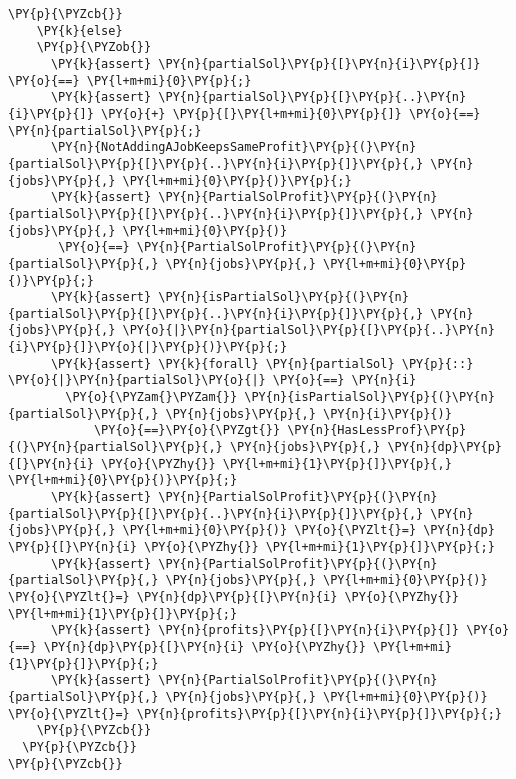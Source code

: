 \begin{itemize}
\begin{Verbatim}[commandchars=\\\{\},fontsize=\footnotesize]
    \PY{p}{\PYZcb{}}
    \PY{k}{else}
    \PY{p}{\PYZob{}}
      \PY{k}{assert} \PY{n}{partialSol}\PY{p}{[}\PY{n}{i}\PY{p}{]} \PY{o}{==} \PY{l+m+mi}{0}\PY{p}{;}
      \PY{k}{assert} \PY{n}{partialSol}\PY{p}{[}\PY{p}{..}\PY{n}{i}\PY{p}{]} \PY{o}{+} \PY{p}{[}\PY{l+m+mi}{0}\PY{p}{]} \PY{o}{==} \PY{n}{partialSol}\PY{p}{;}
      \PY{n}{NotAddingAJobKeepsSameProfit}\PY{p}{(}\PY{n}{partialSol}\PY{p}{[}\PY{p}{..}\PY{n}{i}\PY{p}{]}\PY{p}{,} \PY{n}{jobs}\PY{p}{,} \PY{l+m+mi}{0}\PY{p}{)}\PY{p}{;}
      \PY{k}{assert} \PY{n}{PartialSolProfit}\PY{p}{(}\PY{n}{partialSol}\PY{p}{[}\PY{p}{..}\PY{n}{i}\PY{p}{]}\PY{p}{,} \PY{n}{jobs}\PY{p}{,} \PY{l+m+mi}{0}\PY{p}{)}
       \PY{o}{==} \PY{n}{PartialSolProfit}\PY{p}{(}\PY{n}{partialSol}\PY{p}{,} \PY{n}{jobs}\PY{p}{,} \PY{l+m+mi}{0}\PY{p}{)}\PY{p}{;}
      \PY{k}{assert} \PY{n}{isPartialSol}\PY{p}{(}\PY{n}{partialSol}\PY{p}{[}\PY{p}{..}\PY{n}{i}\PY{p}{]}\PY{p}{,} \PY{n}{jobs}\PY{p}{,} \PY{o}{|}\PY{n}{partialSol}\PY{p}{[}\PY{p}{..}\PY{n}{i}\PY{p}{]}\PY{o}{|}\PY{p}{)}\PY{p}{;}
      \PY{k}{assert} \PY{k}{forall} \PY{n}{partialSol} \PY{p}{::} \PY{o}{|}\PY{n}{partialSol}\PY{o}{|} \PY{o}{==} \PY{n}{i}  
        \PY{o}{\PYZam{}\PYZam{}} \PY{n}{isPartialSol}\PY{p}{(}\PY{n}{partialSol}\PY{p}{,} \PY{n}{jobs}\PY{p}{,} \PY{n}{i}\PY{p}{)}
            \PY{o}{==}\PY{o}{\PYZgt{}} \PY{n}{HasLessProf}\PY{p}{(}\PY{n}{partialSol}\PY{p}{,} \PY{n}{jobs}\PY{p}{,} \PY{n}{dp}\PY{p}{[}\PY{n}{i} \PY{o}{\PYZhy{}} \PY{l+m+mi}{1}\PY{p}{]}\PY{p}{,} \PY{l+m+mi}{0}\PY{p}{)}\PY{p}{;}
      \PY{k}{assert} \PY{n}{PartialSolProfit}\PY{p}{(}\PY{n}{partialSol}\PY{p}{[}\PY{p}{..}\PY{n}{i}\PY{p}{]}\PY{p}{,} \PY{n}{jobs}\PY{p}{,} \PY{l+m+mi}{0}\PY{p}{)} \PY{o}{\PYZlt{}=} \PY{n}{dp} \PY{p}{[}\PY{n}{i} \PY{o}{\PYZhy{}} \PY{l+m+mi}{1}\PY{p}{]}\PY{p}{;} 
      \PY{k}{assert} \PY{n}{PartialSolProfit}\PY{p}{(}\PY{n}{partialSol}\PY{p}{,} \PY{n}{jobs}\PY{p}{,} \PY{l+m+mi}{0}\PY{p}{)} \PY{o}{\PYZlt{}=} \PY{n}{dp}\PY{p}{[}\PY{n}{i} \PY{o}{\PYZhy{}} \PY{l+m+mi}{1}\PY{p}{]}\PY{p}{;}
      \PY{k}{assert} \PY{n}{profits}\PY{p}{[}\PY{n}{i}\PY{p}{]} \PY{o}{==} \PY{n}{dp}\PY{p}{[}\PY{n}{i} \PY{o}{\PYZhy{}} \PY{l+m+mi}{1}\PY{p}{]}\PY{p}{;}
      \PY{k}{assert} \PY{n}{PartialSolProfit}\PY{p}{(}\PY{n}{partialSol}\PY{p}{,} \PY{n}{jobs}\PY{p}{,} \PY{l+m+mi}{0}\PY{p}{)} \PY{o}{\PYZlt{}=} \PY{n}{profits}\PY{p}{[}\PY{n}{i}\PY{p}{]}\PY{p}{;}
    \PY{p}{\PYZcb{}}
  \PY{p}{\PYZcb{}}
\PY{p}{\PYZcb{}}
\end{Verbatim}


\end{itemize}

